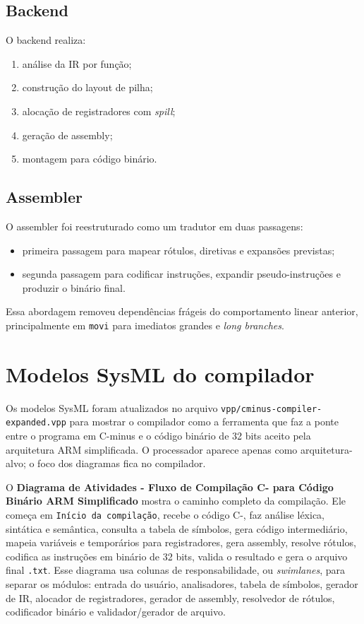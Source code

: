 \documentclass[12pt,a4paper]{article}
\begin{document}
\subsection{Backend}
O backend realiza:
\begin{enumerate}[leftmargin=1.5em]
    \item análise da IR por função;
    \item construção do layout de pilha;
    \item alocação de registradores com \emph{spill};
    \item geração de assembly;
    \item montagem para código binário.
\end{enumerate}

\subsection{Assembler}
O assembler foi reestruturado como um tradutor em duas passagens:
\begin{itemize}[leftmargin=1.5em]
    \item primeira passagem para mapear rótulos, diretivas e expansões previstas;
    \item segunda passagem para codificar instruções, expandir pseudo-instruções e produzir o binário final.
\end{itemize}
Essa abordagem removeu dependências frágeis do comportamento linear anterior, principalmente em \texttt{movi} para imediatos grandes e \emph{long branches}.

\section{Modelos SysML do compilador}
Os modelos SysML foram atualizados no arquivo \texttt{vpp/cminus-compiler-expanded.vpp} para mostrar o compilador como a ferramenta que faz a ponte entre o programa em C-minus e o código binário de 32 bits aceito pela arquitetura ARM simplificada. O processador aparece apenas como arquitetura-alvo; o foco dos diagramas fica no compilador.

O \textbf{Diagrama de Atividades - Fluxo de Compilação C- para Código Binário ARM Simplificado} mostra o caminho completo da compilação. Ele começa em \texttt{Início da compilação}, recebe o código C-, faz análise léxica, sintática e semântica, consulta a tabela de símbolos, gera código intermediário, mapeia variáveis e temporários para registradores, gera assembly, resolve rótulos, codifica as instruções em binário de 32 bits, valida o resultado e gera o arquivo final \texttt{.txt}. Esse diagrama usa colunas de responsabilidade, ou \emph{swimlanes}, para separar os módulos: entrada do usuário, analisadores, tabela de símbolos, gerador de IR, alocador de registradores, gerador de assembly, resolvedor de rótulos, codificador binário e validador/gerador de arquivo.
\end{document}
